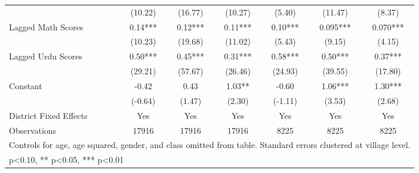 \begin{sidewaystable}[htbp]
\begin{tabular}{l*{6}{c}}
                &  (10.22)   &  (16.77)   &  (10.27)   &   (5.40)   &  (11.47)   &   (8.37)   \\
Lagged Math Scores&     0.14***&     0.12***&     0.11***&     0.10***&    0.095***&    0.070***\\
                &  (10.23)   &  (19.68)   &  (11.02)   &   (5.43)   &   (9.15)   &   (4.15)   \\
Lagged Urdu Scores&     0.50***&     0.45***&     0.31***&     0.58***&     0.50***&     0.37***\\
                &  (29.21)   &  (57.67)   &  (26.46)   &  (24.93)   &  (39.55)   &  (17.80)   \\
Constant        &    -0.42   &     0.43   &     1.03** &    -0.60   &     1.06***&     1.30***\\
                &  (-0.64)   &   (1.47)   &   (2.30)   &  (-1.11)   &   (3.53)   &   (2.68)   \\
District Fixed Effects&      Yes   &      Yes   &      Yes   &      Yes   &      Yes   &      Yes   \\
\midrule
Observations    &    17916   &    17916   &    17916   &     8225   &     8225   &     8225   \\
\bottomrule
\multicolumn{7}{l}{\footnotesize Controls for age, age squared, gender, and class omitted from table. Standard errors clustered at village level.}\\
\multicolumn{7}{l}{\footnotesize * p<0.10, ** p<0.05, *** p<0.01}\\
\end{tabular}
\end{sidewaystable}
